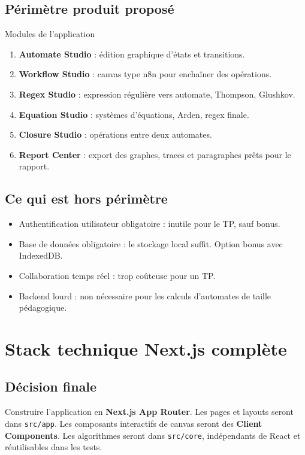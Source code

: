 \documentclass[11pt,a4paper]{report}
\newcommand{\code}[1]{\texttt{#1}}
\begin{document}
\section{Périmètre produit proposé}
\begin{uiblock}{Modules de l'application}
\begin{enumerate}
  \item \textbf{Automate Studio} : édition graphique d'états et transitions.
  \item \textbf{Workflow Studio} : canvas type n8n pour enchaîner des opérations.
  \item \textbf{Regex Studio} : expression régulière vers automate, Thompson, Glushkov.
  \item \textbf{Equation Studio} : systèmes d'équations, Arden, regex finale.
  \item \textbf{Closure Studio} : opérations entre deux automates.
  \item \textbf{Report Center} : export des graphes, traces et paragraphes prêts pour le rapport.
\end{enumerate}
\end{uiblock}

\section{Ce qui est hors périmètre}
\begin{itemize}
  \item Authentification utilisateur obligatoire : inutile pour le TP, sauf bonus.
  \item Base de données obligatoire : le stockage local suffit. Option bonus avec IndexedDB.
  \item Collaboration temps réel : trop coûteuse pour un TP.
  \item Backend lourd : non nécessaire pour les calculs d'automates de taille pédagogique.
\end{itemize}

\chapter{Stack technique Next.js complète}

\section{Décision finale}
\begin{decisionbox}
Construire l'application en \textbf{Next.js App Router}. Les pages et layouts seront dans \code{src/app}. Les composants interactifs de canvas seront des \textbf{Client Components}. Les algorithmes seront dans \code{src/core}, indépendants de React et réutilisables dans les tests.
\end{decisionbox}
\end{document}
